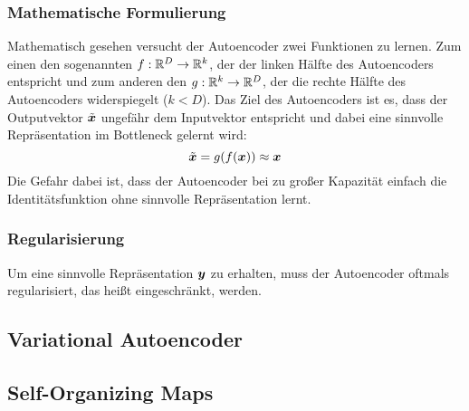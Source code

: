 \subsubsection{Mathematische Formulierung}
\label{ch:MethodenDerDimRed:modern:AE:MathematischeFormulierung}
Mathematisch gesehen versucht der Autoencoder zwei Funktionen zu lernen. Zum einen den sogenannten  $f: \mathbb{R}^D \rightarrow \mathbb{R}^k$, der der linken Hälfte des Autoencoders entspricht und zum anderen den  $g: \mathbb{R}^k \rightarrow \mathbb{R}^D$, der die rechte Hälfte des Autoencoders widerspiegelt ($k < D$). Das Ziel des Autoencoders ist es, dass der Outputvektor $\tilde{\bm{x}}$ ungefähr dem Inputvektor entspricht und dabei eine sinnvolle Repräsentation im Bottleneck gelernt wird:
\begin{equation}
	\tilde{\bm{x}} = g(f(\bm{x})) \approx \bm{x}
\end{equation}
Die Gefahr dabei ist, dass der Autoencoder bei zu großer Kapazität einfach die Identitätsfunktion ohne sinnvolle Repräsentation lernt.

\subsubsection{Regularisierung}

Um eine sinnvolle Repräsentation $\bm{y}$ zu erhalten, muss der Autoencoder oftmals regularisiert, das heißt eingeschränkt, werden.


\subsection{Variational Autoencoder}
\label{ch:MethodenDerDimRed:modern:VAE}

\subsection{Self-Organizing Maps}
\label{ch:MethodenDerDimRed:modern:SOM}
